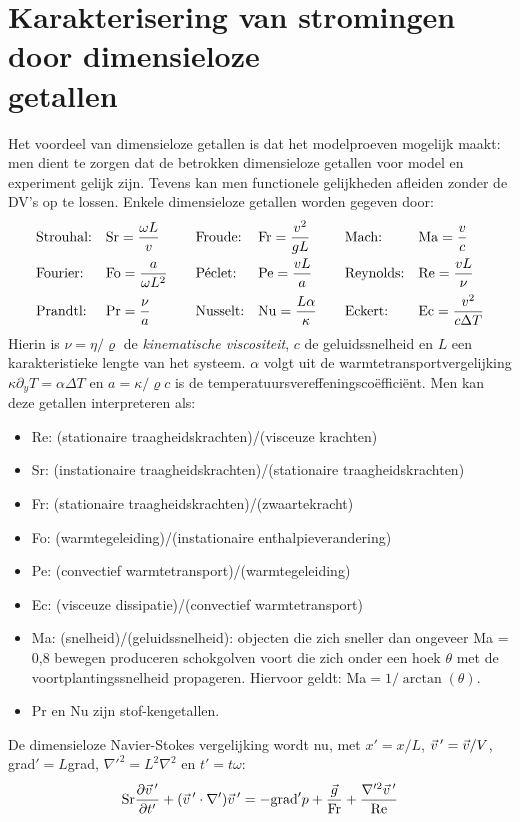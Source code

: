 \section[Karakterisering van stromingen door dimensieloze getallen]
{Karakterisering van stromingen door dimensieloze\\ getallen}
Het voordeel van dimensieloze getallen is dat het modelproeven mogelijk
maakt: men dient te zorgen dat de betrokken dimensieloze getallen voor model
en experiment gelijk zijn. Tevens kan men functionele gelijkheden afleiden
zonder de DV's op te lossen. Enkele dimensieloze getallen worden gegeven door:
\[
\begin{array}{l@{~~~}l@{~~~~~~}l@{~~~}l@{~~~~~~}l@{~~~}l}
\mbox{Strouhal:}&\displaystyle{\rm Sr}=\frac{\omega L}{v}&\mbox{Froude:}&\displaystyle{\rm Fr}=\frac{v^2}{gL}&\mbox{Mach:}&\displaystyle{\rm Ma}=\frac{v}{c}\\[3mm]
\mbox{Fourier:}&\displaystyle{\rm Fo}=\frac{a}{\omega L^2}&\mbox{P\'eclet:}&\displaystyle{\rm Pe}=\frac{vL}{a}&\mbox{Reynolds:}&\displaystyle{\rm Re}=\frac{vL}{\nu}\\[3mm]
\mbox{Prandtl:}&\displaystyle{\rm Pr}=\frac{\nu}{a}&\mbox{Nusselt:}&\displaystyle{\rm Nu}=\frac{L\alpha}{\kappa}&\mbox{Eckert:}&\displaystyle{\rm Ec}=\frac{v^2}{c\Delta T}
\end{array}
\]
Hierin is $\nu=\eta/\varrho$ de {\it kinematische viscositeit}, $c$ de
geluidssnelheid en $L$ een karakteristieke lengte van het systeem. $\alpha$
volgt uit de warmtetransportvergelijking $\kappa\partial_yT=\alpha\Delta T$
en $a=\kappa/\varrho c$ is de temperatuursvereffeningsco\"effici\"ent.
\npar
Men kan deze getallen interpreteren als:
\begin{itemize}
\item Re: (stationaire traagheidskrachten)/(visceuze krachten)
\item Sr: (instationaire traagheidskrachten)/(stationaire traagheidskrachten)
\item Fr: (stationaire traagheidskrachten)/(zwaartekracht)
\item Fo: (warmtegeleiding)/(instationaire enthalpieverandering)
\item Pe: (convectief warmtetransport)/(warmtegeleiding)
\item Ec: (visceuze dissipatie)/(convectief warmtetransport)
\item Ma: (snelheid)/(geluidssnelheid): objecten die zich sneller dan ongeveer
          Ma = 0,8 bewegen produceren schokgolven voort die zich onder een hoek
          $\theta$ met de voortplantingssnelheid propageren. Hiervoor geldt:
          Ma$=1/\arctan(\theta)$.
\item Pr en Nu zijn stof-kengetallen.
\end{itemize}
De dimensieloze Navier-Stokes vergelijking wordt nu, met $x'=x/L$,
$\vec{v}\,'=\vec{v}/V$, grad$'=L$grad, $\nabla'^2=L^2\nabla^2$ en $t'=t\omega$:
\[
{\rm Sr}\frac{\partial \vec{v}\,'}{\partial t'}+(\vec{v}\,'\cdot\nabla')\vec{v}\,'=-{\rm grad}'p+\frac{\vec{g}}{\rm Fr}
+\frac{\nabla'^2\vec{v}\,'}{\rm Re}
\]

